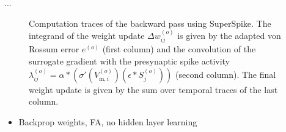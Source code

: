 ...
\begin{figure}
	\centering
	
	\caption[Traces in the backward pass using SuperSpike.]{Computation traces of the backward pass using SuperSpike. The integrand of the weight update $\Delta w_{ij}^{(o)}$ is given by the adapted von Rossum error $e^{(o)}$ (first column) and the convolution of the surrogate gradient with the presynaptic spike activity $\lambda_{ij}^{(o)} = \alpha \ast \left(\sigma'(V_{\text{m},i}^{(o)}) \left(\epsilon \ast S_j^{(o)}\right)\right)$ (second column). The final weight update is given by the sum over temporal traces of the last column.}
	\label{weightchangesplot}
\end{figure}


\begin{itemize}
	\item Backprop weights, FA, no hidden layer learning
\end{itemize}